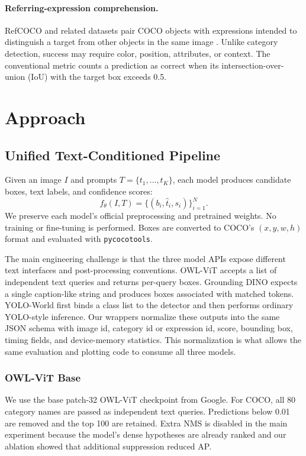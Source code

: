 \documentclass[conference]{IEEEtran}
\begin{document}
\paragraph{Referring-expression comprehension.}
RefCOCO and related datasets pair COCO objects with expressions intended to
distinguish a target from other objects in the same image
\cite{yu2016referring}. Unlike category detection, success may require color,
position, attributes, or context. The conventional metric counts a prediction
as correct when its intersection-over-union (IoU) with the target box exceeds
0.5.

\section{Approach}

\subsection{Unified Text-Conditioned Pipeline}

Given an image $I$ and prompts $T=\{t_1,\ldots,t_K\}$, each model produces
candidate boxes, text labels, and confidence scores:
\begin{equation}
  f_\theta(I,T) = \{(b_i, \hat{t}_i, s_i)\}_{i=1}^{N}.
\end{equation}
We preserve each model's official preprocessing and pretrained weights. No
training or fine-tuning is performed. Boxes are converted to COCO's
$(x,y,w,h)$ format and evaluated with \texttt{pycocotools}.

The main engineering challenge is that the three model APIs expose different
text interfaces and post-processing conventions. OWL-ViT accepts a list of
independent text queries and returns per-query boxes. Grounding DINO expects a
single caption-like string and produces boxes associated with matched tokens.
YOLO-World first binds a class list to the detector and then performs ordinary
YOLO-style inference. Our wrappers normalize these outputs into the same JSON
schema with image id, category id or expression id, score, bounding box, timing
fields, and device-memory statistics. This normalization is what allows the
same evaluation and plotting code to consume all three models.

\subsubsection*{OWL-ViT Base}
We use the base patch-32 OWL-ViT checkpoint from Google. For COCO, all 80
category names are passed as independent text queries. Predictions below 0.01
are removed and the top 100 are retained. Extra NMS is disabled in the main
experiment because the model's dense hypotheses are already ranked and our
ablation showed that additional suppression reduced AP.
\end{document}
